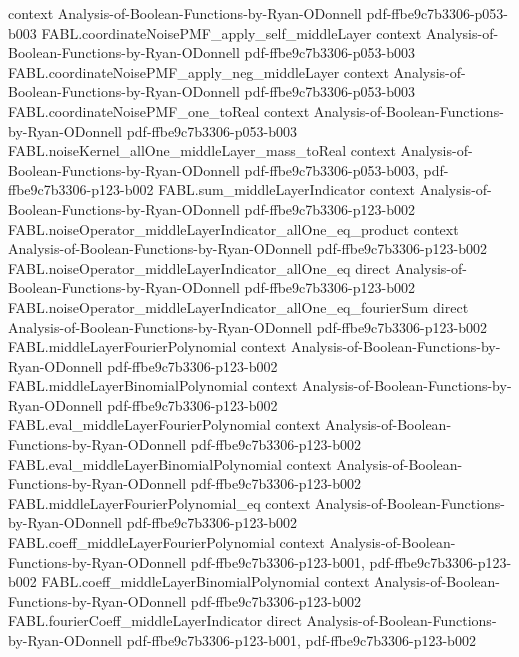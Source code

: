 \begin{theorem}
  {context}
  {Analysis-of-Boolean-Functions-by-Ryan-ODonnell}
  {pdf-ffbe9c7b3306-p053-b003}
\proofstep
  {FABL.coordinateNoisePMF_apply_self_middleLayer}
  {context}
  {Analysis-of-Boolean-Functions-by-Ryan-ODonnell}
  {pdf-ffbe9c7b3306-p053-b003}
\proofstep
  {FABL.coordinateNoisePMF_apply_neg_middleLayer}
  {context}
  {Analysis-of-Boolean-Functions-by-Ryan-ODonnell}
  {pdf-ffbe9c7b3306-p053-b003}
\proofstep
  {FABL.coordinateNoisePMF_one_toReal}
  {context}
  {Analysis-of-Boolean-Functions-by-Ryan-ODonnell}
  {pdf-ffbe9c7b3306-p053-b003}
\proofstep
  {FABL.noiseKernel_allOne_middleLayer_mass_toReal}
  {context}
  {Analysis-of-Boolean-Functions-by-Ryan-ODonnell}
  {pdf-ffbe9c7b3306-p053-b003,
    pdf-ffbe9c7b3306-p123-b002}
\proofstep
  {FABL.sum_middleLayerIndicator}
  {context}
  {Analysis-of-Boolean-Functions-by-Ryan-ODonnell}
  {pdf-ffbe9c7b3306-p123-b002}
\proofstep
  {FABL.noiseOperator_middleLayerIndicator_allOne_eq_product}
  {context}
  {Analysis-of-Boolean-Functions-by-Ryan-ODonnell}
  {pdf-ffbe9c7b3306-p123-b002}
\proofstep
  {FABL.noiseOperator_middleLayerIndicator_allOne_eq}
  {direct}
  {Analysis-of-Boolean-Functions-by-Ryan-ODonnell}
  {pdf-ffbe9c7b3306-p123-b002}
\proofstep
  {FABL.noiseOperator_middleLayerIndicator_allOne_eq_fourierSum}
  {direct}
  {Analysis-of-Boolean-Functions-by-Ryan-ODonnell}
  {pdf-ffbe9c7b3306-p123-b002}
\proofstep
  {FABL.middleLayerFourierPolynomial}
  {context}
  {Analysis-of-Boolean-Functions-by-Ryan-ODonnell}
  {pdf-ffbe9c7b3306-p123-b002}
\proofstep
  {FABL.middleLayerBinomialPolynomial}
  {context}
  {Analysis-of-Boolean-Functions-by-Ryan-ODonnell}
  {pdf-ffbe9c7b3306-p123-b002}
\proofstep
  {FABL.eval_middleLayerFourierPolynomial}
  {context}
  {Analysis-of-Boolean-Functions-by-Ryan-ODonnell}
  {pdf-ffbe9c7b3306-p123-b002}
\proofstep
  {FABL.eval_middleLayerBinomialPolynomial}
  {context}
  {Analysis-of-Boolean-Functions-by-Ryan-ODonnell}
  {pdf-ffbe9c7b3306-p123-b002}
\proofstep
  {FABL.middleLayerFourierPolynomial_eq}
  {context}
  {Analysis-of-Boolean-Functions-by-Ryan-ODonnell}
  {pdf-ffbe9c7b3306-p123-b002}
\proofstep
  {FABL.coeff_middleLayerFourierPolynomial}
  {context}
  {Analysis-of-Boolean-Functions-by-Ryan-ODonnell}
  {pdf-ffbe9c7b3306-p123-b001,
    pdf-ffbe9c7b3306-p123-b002}
\proofstep
  {FABL.coeff_middleLayerBinomialPolynomial}
  {context}
  {Analysis-of-Boolean-Functions-by-Ryan-ODonnell}
  {pdf-ffbe9c7b3306-p123-b002}
\proofstep
  {FABL.fourierCoeff_middleLayerIndicator}
  {direct}
  {Analysis-of-Boolean-Functions-by-Ryan-ODonnell}
  {pdf-ffbe9c7b3306-p123-b001,
    pdf-ffbe9c7b3306-p123-b002}

\end{theorem}

